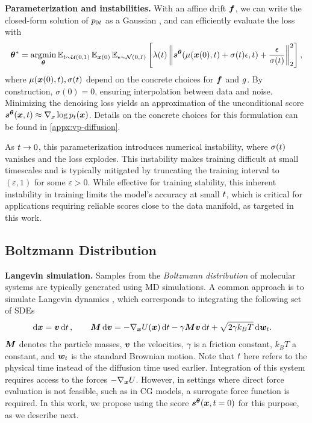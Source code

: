 \textbf{Parameterization and instabilities.} With an affine drift ${\bm{f}}$, we can write the closed-form solution of $p_{0{t}}$ as a Gaussian \citep{saarka2019}, and can efficiently evaluate the loss with
\begin{equation}
    {\bm{\theta}}^* = \operatorname*{argmin}_{{\bm{\theta}}} \operatorname{\mathbb{E}}_{{t} \sim \mathcal{U}(0, 1)} \operatorname{\mathbb{E}}_{{{\bm{x}}}(0)} \operatorname{\mathbb{E}}_{\epsilon \sim {\mathcal{N}}(0, I)} \left[ \lambda({t}) \left\Vert {{\bm{s}}^{\bm{\theta}}} (\mu({{\bm{x}}}(0), {t}) + \sigma(t) \epsilon, {t}) + \frac{\epsilon}{\sigma(t)} \right\Vert^2_2 \right],
\end{equation}
where $\mu({{\bm{x}}}(0), {t}), \sigma({t})$ depend on the concrete choices for ${\bm{f}}$ and ${g}$. By construction, $\sigma(0) = 0$, ensuring interpolation between data and noise. Minimizing the denoising loss yields an approximation of the unconditional score ${{\bm{s}}^{\bm{\theta}}} ({{\bm{x}}}, {t}) \approx \nabla_x \log p_{t} ({{\bm{x}}})$. Details on the concrete choices for this formulation can be found in \cref{appx:vp-diffusion}.

As ${t} \rightarrow 0$, this parameterization introduces numerical instability, where $\sigma({t})$ vanishes and the loss explodes. This instability makes training difficult at small timescales \citep{kim2022softtruncation} and is typically mitigated by truncating the training interval to $(\varepsilon, 1)$ for some $\varepsilon > 0$. While effective for training stability, this inherent instability in training limits the model's accuracy at small ${t}$, which is critical for applications requiring reliable scores close to the data manifold, as targeted in this work. 

\subsection{Boltzmann Distribution}
\textbf{Langevin simulation.} Samples from the \emph{Boltzmann distribution} of molecular systems are typically generated using \gls{MD} simulations. A common approach is to simulate Langevin dynamics \citep{leimkuhler2015md}, which corresponds to integrating the following set of \glspl{SDE}
\begin{align} 
   \operatorname{d}\!{{{\bm{x}}}} &= {\bm{v}} \operatorname{d}\!{{t}} \,,  \qquad {\bm{M}} \operatorname{d}\!{{\bm{v}}} = - \nabla_{{\bm{x}}} U({{\bm{x}}}) \operatorname{d}\!{t} - \gamma {\bm{M}} {\bm{v}} \operatorname{d}\!{t} + \sqrt{2 \gamma k_B T} \operatorname{d}\!{{\bm{w}}_{t}}.
   \label{eq:langevin}
\end{align}
${\bm{M}}$ denotes the particle masses, ${\bm{v}}$ the velocities, $\gamma$ is a friction constant, $k_BT$ a constant, and ${\bm{w}}_{t}$ is the standard Brownian motion. Note that ${t}$ here refers to the physical time instead of the diffusion time used earlier. Integration of this system requires access to the forces $- \nabla_{{\bm{x}}} U$. However, in settings where direct force evaluation is not feasible, such as in \gls{CG} models, a surrogate force function is required. In this work, we propose using the score ${{\bm{s}}^{\bm{\theta}}}({{\bm{x}}}, {t}=0)$ for this purpose, as we describe next.

